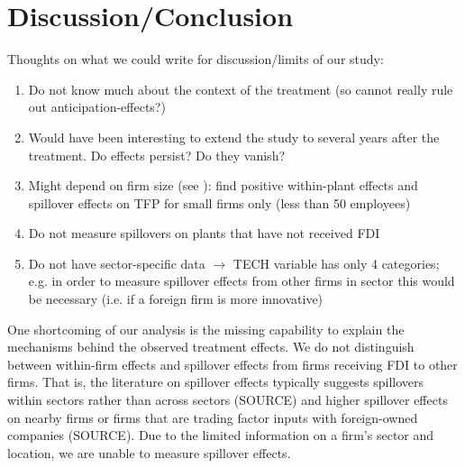 \documentclass[a4paper,11pt]{scrartcl}
\newcommand{\comment}[1]{}
\begin{document}
\section{Discussion/Conclusion}

\comment{
For citation: \\
you have to add your reference firstly in bibCG. After having done so you can always include the reference in the actual file as follows: \\
 \citet{aitken99}\\
\citep[p.~35]{CaliendoHujerThomsen2008}	}

Thoughts on what we could write for discussion/limits of our study: 
\begin{enumerate}
\item Do not know much about the context of the treatment (so cannot really rule out anticipation-effects?)
\item Would have been interesting to extend the study to several years after the treatment. Do effects persist? Do they vanish? 
\item Might depend on firm size (see \citet{aitken99}): find positive within-plant effects and spillover effects on TFP for small firms only (less than 50 employees)
\item Do not measure spillovers on plants that have not received FDI
\item Do not have sector-specific data $\rightarrow$ TECH variable has only 4 categories; e.g. in order to measure spillover effects from other firms in sector this would be necessary (i.e. if a foreign firm is more innovative)
\end{enumerate}

One shortcoming of our analysis is the missing capability to explain the mechanisms behind the observed treatment effects. We do not distinguish between within-firm effects and spillover effects from firms receiving FDI to other firms. That is, the literature on spillover effects typically suggests spillovers within sectors rather than across sectors (SOURCE) and higher spillover effects on nearby firms or firms that are trading factor inputs with foreign-owned companies (SOURCE). Due to the limited information on a firm's sector and location, we are unable to measure spillover effects. 

\newpage

 
\newpage
\end{document}
